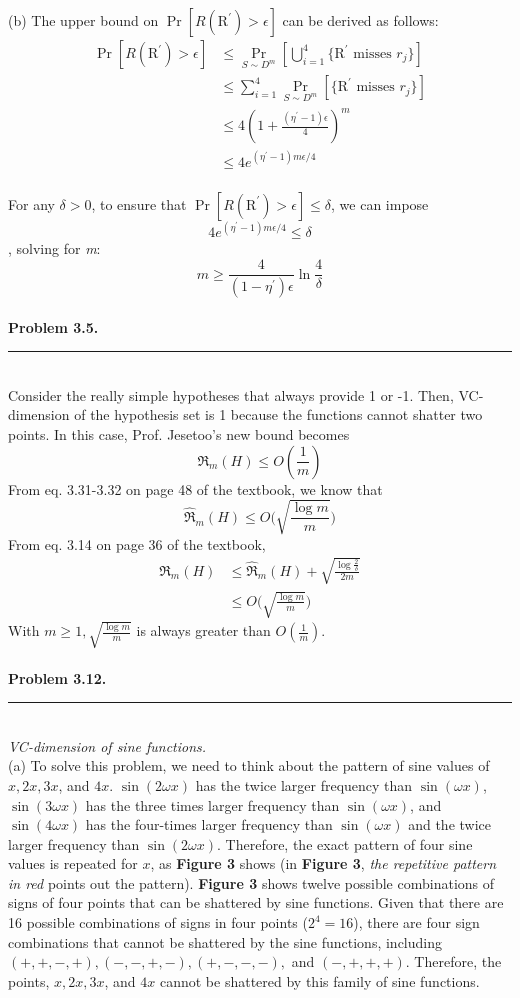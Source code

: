 \documentclass[letterpaper,11pt,notitlepage]{article}
\begin{document}
\noindent (b) The upper bound on $\Pr[R(\text{R}^\prime)>\epsilon]$ can be derived as follows:
\begin{align*}
\Pr[R(\text{R}^\prime)>\epsilon] &\le \Pr_{S\sim D^m}[\bigcup^{4}_{i=1}\{\text{R}^\prime \text{ misses }r_j\}]\\
&\le \sum^{4}_{i=1} \Pr_{S\sim D^m}[\{\text{R}^\prime \text{ misses }r_j\}]\\
&\le 4(1+\frac{(\eta^\prime-1)\epsilon}{4})^m\\
&\le 4e^{(\eta^\prime-1)m\epsilon/4}\\
\end{align*}

\indent For any $\delta >0$, to ensure that $\Pr[R(\text{R}^\prime)>\epsilon] \le \delta$, we can impose
\[4e^{(\eta^\prime-1)m\epsilon/4} \le \delta\]
\indent, solving for \textit{m}:
\[m\ge\frac{4}{(1-\eta^\prime)\epsilon}\ln\frac{4}{\delta}\]\leavevmode \\

\hspace*{-1cm}\textbf{Problem 3.5.}  \rule{10.5cm}{0.4pt}\\
\noindent Consider the really simple hypotheses that always provide 1 or -1. Then, VC-dimension of the hypothesis set is 1 because the functions cannot shatter two points. In this case, Prof. Jesetoo's new bound becomes 
\[\Re_m(H) \le O(\frac{1}{m})\]
From eq. 3.31-3.32 on page 48 of the textbook, we know that 
\[\hat{\Re}_m(H) \le O\Big(\sqrt{\frac{\log m}{m}}\Big)\]
From eq. 3.14 on page 36 of the textbook, 
\begin{align*}
\Re_m(H) &\le \hat{\Re}_m(H)+\sqrt{\frac{\log \frac{2}{\delta}}{2m}}\\
&\le O\Big(\sqrt{\frac{\log m}{m}}\Big)
\end{align*}
With $m \ge 1, \sqrt{\frac{\log m}{m}}$ is always greater than $O(\frac{1}{m})$.\\\\

\hspace*{-1cm}\textbf{Problem 3.12.}  \rule{10.5cm}{0.4pt}\\
\noindent\textit{VC-dimension of sine functions.}\\

\noindent (a) To solve this problem, we need to think about the pattern of sine values of $x, 2x, 3x$, and $4x$. $\sin(2\omega x)$ has the twice larger frequency than $\sin(\omega x)$, $\sin(3\omega x)$ has the three times larger frequency than $\sin(\omega x)$, and $\sin(4\omega x)$ has the four-times larger frequency than $\sin(\omega x)$ and the twice larger frequency than $\sin(2\omega x)$. Therefore, the exact pattern of four sine values is repeated for $x$, as \textbf{Figure 3} shows (in \textbf{Figure 3}, \textit{the repetitive pattern in red} points out the pattern). \textbf{Figure 3} shows twelve possible combinations of signs of four points that can be shattered by sine functions. Given that there are 16 possible combinations of signs in four points ($2^4 = 16$), there are four sign combinations that cannot be shattered by the sine functions, including $(+,+,-,+), (-,-,+,-), (+,-,-,-),$ and $(-,+,+,+)$. Therefore, the points, $x, 2x, 3x$, and $4x$ cannot be shattered by this family of sine functions. 
\end{document}
